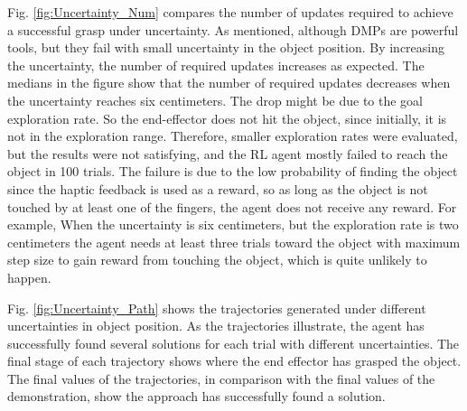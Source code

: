 \documentclass[letterpaper, 10 pt, conference]{ieeeconf}  %
\begin{document}
\noindent
Fig. \ref{fig:Uncertainty_Num} compares the number of updates required to achieve a successful grasp under uncertainty. As mentioned, although DMPs are powerful tools, but they fail with small uncertainty in the object position. By increasing the uncertainty, the number of required updates increases as expected. The medians in the figure show that the number of required updates decreases when the uncertainty reaches six centimeters. The drop might be due to the goal exploration rate. So the end-effector does not hit the object, since initially, it is not in the exploration range. Therefore, smaller exploration rates were evaluated, but the results were not satisfying, and the RL agent mostly failed to reach the object in 100 trials. The failure is due to the low probability of finding the object since the haptic feedback is used as a reward, so as long as the object is not touched by at least one of the fingers, the agent does not receive any reward. For example, When the uncertainty is six centimeters, but the exploration rate is two centimeters the agent needs at least three trials toward the object with maximum step size to gain reward from touching the object, which is quite unlikely to happen. 
%     

\noindent
Fig. \ref{fig:Uncertainty_Path} shows the trajectories generated under different uncertainties in object position. As the trajectories illustrate, the agent has successfully found several solutions for each trial with different uncertainties. The final stage of each trajectory shows where the end effector has grasped the object. The final values of the trajectories, in comparison with the final values of the demonstration, show the approach has successfully found a solution.

\end{document}
